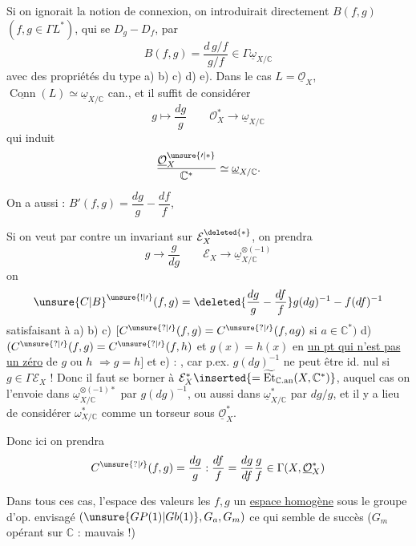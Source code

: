 Si on ignorait la notion de connexion, on introduirait directement
$B(f,g)$ $(f,g\in\Gamma L^*)$, qui se  $D_g-D_f$, par
\[
B(f,g)=\frac{d\,g/f}{g/f}\in\Gamma\underline\omega_{X/\mathbb C}
\]
avec des propriétés du type a) b) c) d) e). Dans le cas
$L=\underline{\mathcal O}_X$,
$\underline{\operatorname{Conn}}(L)\simeq\underline\omega_{X/\mathbb C}$
can., et il suffit de considérer
\[
g\longmapsto\frac{dg}{g}\qquad
\mathcal O_X^*\longrightarrow\underline\omega_{X/\mathbb C}
\]
qui induit
\[
\frac{\underline{\mathcal O}_X^{\unsure{\prime|*}}}{\mathbb C^*}
\simeq\underline\omega_{X/\mathbb C}.
\]

On a aussi : $B'(f,g)=\dfrac{dg}{g}-\dfrac{df}{f}$, \unsure{\ldots}

Si on veut par contre un invariant sur $\mathcal E_X^{\deleted{*}}$, on prendra
\[
g\longrightarrow\frac{g}{dg}\qquad
\mathcal E_X\longrightarrow\underline\omega_{X/\mathbb C}^{\otimes(-1)}
\]
on  
\[
\unsure{C|B}^{\unsure{!|\prime}}(f,g)=
\deleted{\frac{dg}{g}-\frac{df}{f}}
g(dg)^{-1}-f(df)^{-1}
\]
satisfaisant à a) b) c)
$[C^{\unsure{?|\prime}}(f,g)=C^{\unsure{?|\prime}}(f,ag)$
si $a\in\mathbb C^*)$
d) $(C^{\unsure{?|\prime}}(f,g)=C^{\unsure{?|\prime}}(f,h)$ et
$g(x)=h(x)$ en \uline{un pt qui n'est pas un zéro} de $g$ ou $h$
$\Longrightarrow g=h]$ et e) 
 : , car
p.ex. $g(dg)^{-1}$ ne peut être id. nul si $g\in\Gamma \mathcal E_X$ !
Donc il faut se borner à
$\mathcal E_X^*\inserted{=\widetilde{\operatorname{Et}}_{\mathbb C.\mathrm{an}}
(X,\mathbb C^*)}$, auquel cas on l'envoie dans
$\underline\omega_{X/\mathbb C}^{\otimes(-1)*}$ par $g(dg)^{-1}$,
ou aussi dans $\underline\omega_{X/\mathbb C}^*$ par $dg/g$,
et il y a lieu de considérer $\omega_{X/\mathbb C}^*$ comme un torseur
sous $\underline{\mathcal O}_X^*$.

Donc ici on prendra
\[
C^{\unsure{?|\prime}}(f,g)=\frac{dg}{g}:\frac{df}{f}
=\frac{dg}{df}\frac{g}{f}\in\Gamma(X,\underline{\mathcal O}_X^*)
\]

Dans tous ces cas, l'espace des valeurs  les $f,g$
 un \uline{espace homogène} sous le groupe d'op.
envisagé $(\unsure{GP(1)|Gb(1)},G_a,G_m)$ ce qui semble
 de succès ($G_m$ opérant sur $\mathbb C$ : mauvais !)

